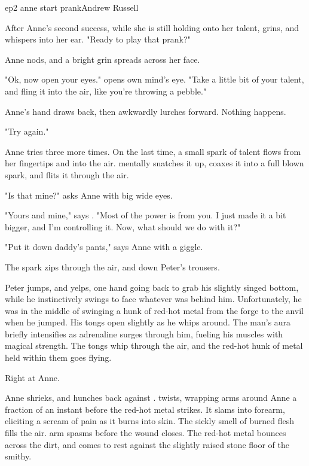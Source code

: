 \documentclass{book}
\begin{document}
\begin{childnode}{ep2 anne start prank}{Andrew Russell}

    After Anne's second success, while she is still holding onto her talent, \name{} grins, and whispers into her ear. "Ready to play that prank?"

    Anne nods, and a bright grin spreads across her face.

    "Ok, now open your eyes." \name{} opens \hisher{} own mind's eye. "Take a little bit of your talent, and fling it into the air, like you're throwing a pebble."

    Anne's hand draws back, then awkwardly lurches forward. Nothing happens.

    "Try again."

    Anne tries three more times. On the last time, a small spark of talent flows from her fingertips and into the air. \name{} mentally snatches it up, coaxes it into a full blown spark, and flits it through the air.

    "Is that mine?" asks Anne with big wide eyes.

    "Yours and mine," says \name{}. "Most of the power is from you. I just made it a bit bigger, and I'm controlling it. Now, what should we do with it?"

    "Put it down daddy's pants," says Anne with a giggle.

    \name{} 

    The spark zips through the air, and down Peter's trousers.
    
    Peter jumps, and yelps, one hand going back to grab his slightly singed bottom, while he instinctively swings to face whatever was behind him. Unfortunately, he was in the middle of swinging a hunk of red-hot metal from the forge to the anvil when he jumped. 
    His tongs open slightly as he whips around. The man's aura briefly intensifies  as adrenaline surges through him, fueling his muscles with magical strength. The tongs whip through the air, and the red-hot hunk of metal held within them goes flying.

    Right at Anne.

    Anne shrieks, and hunches back against \name{}. \name{} twists, wrapping \hisher{} arms around Anne a fraction of an instant before the red-hot metal strikes. It slams into \names{} forearm, eliciting a scream of pain as it
    burns into \hisher{} skin. The sickly smell of burned flesh fills the air. \names{} arm spasms before the wound closes. The red-hot metal bounces across the dirt, and comes to rest against the slightly raised stone floor of the smithy. 


\end{childnode}
\end{document}
